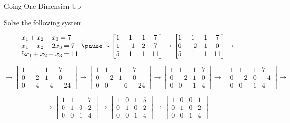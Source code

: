 \documentclass[xcolor=dvipsnames,aspectratio=169,t]{beamer}
\begin{document}
\begin{frame}{Going One Dimension Up}

  {\small  Solve the following system.}
  
  {\small
   \[
   \begin{array}{l}
     x_1 +x_2 +x_3=7 \\
     x_1 -x_2 +2x_3= 7\\
     5x_1+x_2+x_3=11
  \end{array}  \pause \sim
      \begin{bmatrix}
        1 & 1 & 1 & 7\\
        1 & -1 & 2 & 7\\
        5 & 1 & 1 & 11
      \end{bmatrix}
      \rightarrow
       \begin{bmatrix}
        1 & 1 & 1 & 7\\
        0 & -2 & 1 & 0\\
        5 & 1 & 1 & 11
      \end{bmatrix}
    \rightarrow      \]
   }

  {\small
  \[    \rightarrow 
  \begin{bmatrix}
        1 & 1 & 1 & 7\\
        0 & -2 & 1 & 0\\
        0 & -4 & -4 & -24
      \end{bmatrix}
  \rightarrow
  \begin{bmatrix}
        1 & 1 & 1 & 7\\
        0 & -2 & 1 & 0\\
        0 & 0 & -6 & -24
  \end{bmatrix}
  \rightarrow
  \begin{bmatrix}
        1 & 1 & 1 & 7\\
        0 & -2 & 1 & 0\\
        0 & 0 & 1 & 4
      \end{bmatrix}  
  \rightarrow
  \begin{bmatrix}
        1 & 1 & 1 & 7\\
        0 & -2 & 0 & -4\\
        0 & 0 & 1 & 4
      \end{bmatrix}  
  \rightarrow
  \]}

  {\small
    \[ \rightarrow
  \begin{bmatrix}
        1 & 1 & 1 & 7\\
        0 & 1 & 0 & 2\\
        0 & 0 & 1 & 4
      \end{bmatrix}  
  \rightarrow
  \begin{bmatrix}
        1 & 0 & 1 & 5\\
        0 & 1 & 0 & 2\\
        0 & 0 & 1 & 4
      \end{bmatrix}  
  \rightarrow
  \begin{bmatrix}
        1 & 0 & 0 & 1\\
        0 & 1 & 0 & 2\\
        0 & 0 & 1 & 4
      \end{bmatrix}  
  \]}
    

\end{frame}
\end{document}
